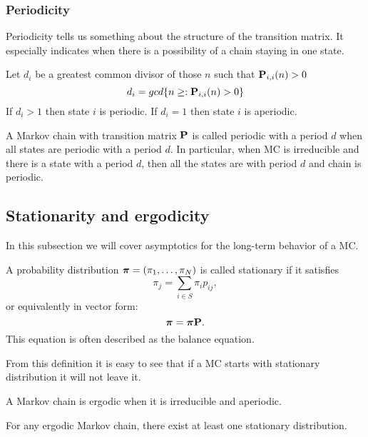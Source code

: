 	\subsubsection{Periodicity}
		Periodicity tells us something about the structure of the transition matrix. It especially indicates when there is a possibility of a chain staying in one state.
		\begin{definition}[Periodicity]
			Let $d_i$ be a greatest common divisor of those $n$ such that $\mathbf{P}_{i,i}(n)>0$ \ie
			\begin{equation*}
				d_i = gcd\{ n \geq : \mathbf{P}_{i,i}(n)>0 \}
			\end{equation*}
			If $d_i > 1$ then state $i$ is periodic. If $d_i = 1$ then state $i$ is aperiodic.
		\end{definition}
	
		\begin{definition}
			A Markov chain with transition matrix $\mathbf{P}$ is called periodic with a period $d$ when all states are periodic with a period $d$. In particular, when MC is irreducible and there is a state with a period $d$, then all the states are with period $d$ and chain is periodic.
		\end{definition}	
	

\subsection{Stationarity and ergodicity}
	In this subsection we will cover asymptotics for the long-term behavior of a MC.
	\begin{definition}[Stationarity]
		A probability distribution $\boldsymbol{\pi} = (\pi_1, \ldots, \pi_N)$ is called stationary if it satisfies
		\begin{equation*}
			\pi_j = \sum_{i \in S} \pi_i p_{ij},
		\end{equation*}
		or equivalently in vector form:
		\begin{equation*}
			\boldsymbol{\pi} = \boldsymbol{\pi} \mathbf{P}.
		\end{equation*}
		This equation is often described as the balance equation.
	\end{definition}
	From this definition it is easy to see that if a MC starts with stationary distribution it will not leave it. 
	
	\begin{definition}[Ergodicity]
		A Markov chain is ergodic when it is irreducible and aperiodic.
	\end{definition}
	
	\begin{theorem} \label{thm:existance_stationary}
		For any ergodic Markov chain, there exist at least one stationary distribution.
	\end{theorem}
	
